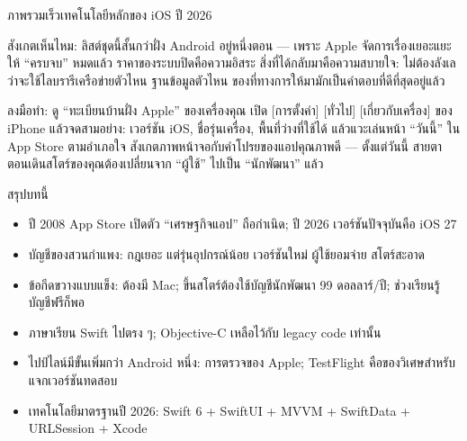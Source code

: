 \begin{center}\small\color{gray}ภาพรวมเร็วเทคโนโลยีหลักของ iOS ปี 2026\end{center}

สังเกตเห็นไหม: ลิสต์ชุดนี้สั้นกว่าฝั่ง Android อยู่หนึ่งตอน — เพราะ Apple จัดการเรื่องเยอะแยะให้ “ครบจบ” หมดแล้ว ราคาของระบบปิดคือความอิสระ สิ่งที่ได้กลับมาคือความสบายใจ: ไม่ต้องลังเลว่าจะใช้ไลบรารีเครือข่ายตัวไหน ฐานข้อมูลตัวไหน ของที่ทางการให้มามักเป็นคำตอบที่ดีที่สุดอยู่แล้ว

\begin{tcbpractice}{ลงมือทำ: ดู “ทะเบียนบ้านฝั่ง Apple” ของเครื่องคุณ}
เปิด [การตั้งค่า] [ทั่วไป] [เกี่ยวกับเครื่อง] ของ iPhone แล้วจดสามอย่าง: เวอร์ชัน iOS, ชื่อรุ่นเครื่อง, พื้นที่ว่างที่ใช้ได้ แล้วแวะเล่นหน้า “วันนี้” ใน App Store ตามอำเภอใจ สังเกตภาพหน้าจอกับคำโปรยของแอปคุณภาพดี — ตั้งแต่วันนี้ สายตาตอนเดินสโตร์ของคุณต้องเปลี่ยนจาก “ผู้ใช้” ไปเป็น “นักพัฒนา” แล้ว

\end{tcbpractice}

\begin{tcbsummary}{สรุปบทนี้}
\begin{itemize}
  \item ปี 2008 App Store เปิดตัว “เศรษฐกิจแอป” ถือกำเนิด; ปี 2026 เวอร์ชันปัจจุบันคือ iOS 27
  \item บัญชีของสวนกำแพง: กฎเยอะ แต่รุ่นอุปกรณ์น้อย เวอร์ชันใหม่ ผู้ใช้ยอมจ่าย สโตร์สะอาด
  \item ข้อกีดขวางแบบแข็ง: ต้องมี Mac; ขึ้นสโตร์ต้องใช้บัญชีนักพัฒนา 99 ดอลลาร์/ปี; ช่วงเรียนรู้บัญชีฟรีก็พอ
  \item ภาษาเรียน Swift ไปตรง ๆ; Objective-C เหลือไว้กับ legacy code เท่านั้น
  \item ไปป์ไลน์มีขั้นเพิ่มกว่า Android หนึ่ง: การตรวจของ Apple; TestFlight คือของวิเศษสำหรับแจกเวอร์ชันทดสอบ
  \item เทคโนโลยีมาตรฐานปี 2026: Swift 6 + SwiftUI + MVVM + SwiftData + URLSession + Xcode
\end{itemize}

\end{tcbsummary}
